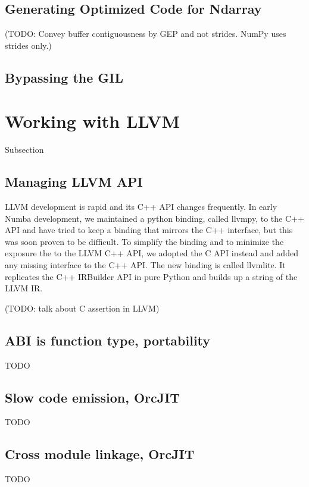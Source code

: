 \documentclass{acm_proc_article-sp}
\begin{document}
\subsection{Generating Optimized Code for Ndarray}

(TODO: Convey buffer contiguousness by GEP and not strides.
NumPy uses strides only.)

\subsection{Bypassing the GIL}

\section{Working with LLVM}
Subsection

\subsection{Managing LLVM API}

LLVM development is rapid and its C++ API changes frequently.
In early Numba development, we maintained a python binding, called llvmpy,
to the C++ API and have tried to keep a binding that mirrors the C++ interface,
but this was soon proven to be difficult.
To simplify the binding and to minimize the exposure the to the LLVM C++ API,
we adopted the C API instead and added any missing interface to the C++ API.
The new binding is called llvmlite.  It replicates the C++ IRBuilder API in
pure Python and builds up a string of the LLVM IR.

(TODO: talk about C assertion in LLVM)

\subsection{ABI is function type, portability}

TODO

\subsection{Slow code emission, OrcJIT}

TODO

\subsection{Cross module linkage, OrcJIT}

TODO
\end{document}
